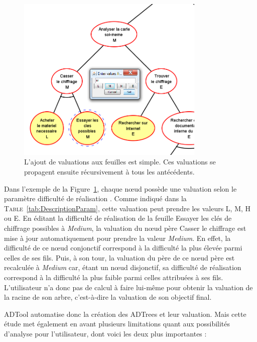 	\begin{figure}[h]
        \centering
        \includegraphics[width=0.8\textwidth]{figure/adtool_add_values.png}
        \caption{L'ajout de valuations aux feuilles est simple. Ces valuations se propagent ensuite récursivement à tous les antécédents.}
        \label{fig:arbre_exemple_2}
    \end{figure}
	
	Dans l'exemple de la {\sc Figure}~\ref{fig:arbre_exemple_2}, chaque nœud possède une valuation selon le paramètre \og difficulté de réalisation \fg{}. Comme indiqué dans la \textsc{Table}~\ref{tab:DescriptionParam}, cette valuation peut prendre les valeurs L, M, H ou E. En éditant la difficulté de réalisation de la feuille \og Essayer les clés de chiffrage possibles \fg{} à \emph{Medium}, la valuation du nœud père \og Casser le chiffrage \fg{} est mise à jour automatiquement pour prendre la valeur \emph{Medium}. En effet, la difficulté de ce nœud conjonctif correspond à la difficulté la plus élevée parmi celles de ses fils. Puis, à son tour, la valuation du père de ce nœud père est recalculée à \emph{Medium} car, étant un nœud disjonctif, sa difficulté de réalisation correspond à la difficulté la plus faible parmi celles attribuées à ses fils. L'utilisateur n'a donc pas de calcul à faire lui-même pour obtenir la valuation de la racine de son arbre, c'est-à-dire la valuation de son objectif final. 

	ADTool automatise donc la création des ADTrees et leur valuation. Mais cette étude met également en avant plusieurs limitations quant aux possibilités d'analyse pour l'utilisateur, dont voici les deux plus importantes :  

